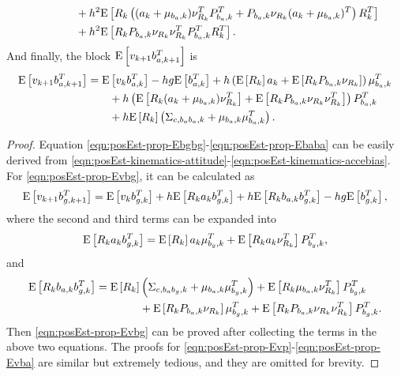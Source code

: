 \begin{theorem}
\begin{align}
		&\qquad\qquad + h^2\mathrm{E}\left[  R_k\left( (a_k+\mu_{b_a,k})\nu_{R_k}^TP_{b_a,k}^T + P_{b_a,k}\nu_{R_k}(a_k+\mu_{b_a,k})^T \right)R_k^T  \right] \nonumber \\
		&\qquad\qquad + h^2\mathrm{E}\left[ R_kP_{b_a,k}\nu_{R_k}\nu_{R_k}^TP_{b_a,k}^TR_k^T \right].
	\end{align}
	And finally, the block $\mathrm{E}\left[ v_{k+1}b_{a,k+1}^T \right]$ is
	\begin{align} \label{eqn:posEst-prop-Evba}
		\mathrm{E}\left[ v_{k+1}b_{a,k+1}^T \right] &= \mathrm{E}\left[ v_kb_{a,k}^T \right] - hg\mathrm{E}\left[ b_{a,k}^T \right] + h\left( \mathrm{E}\left[ R_k \right]a_k + \mathrm{E}\left[ R_kP_{b_a,k}\nu_{R_k} \right] \right) \mu_{b_a,k}^T \nonumber \\
		&\qquad + h\left( \mathrm{E}\left[ R_k(a_k+\mu_{b_a,k})\nu_{R_k}^T \right] + \mathrm{E}\left[ R_kP_{b_a,k}\nu_{R_k}\nu_{R_k}^T \right] \right) P_{b_a,k}^T \nonumber \\
		&\qquad + h\mathrm{E}\left[ R_k \right] \left( \Sigma_{c,b_ab_a,k} + \mu_{b_a,k}\mu_{b_a,k}^T \right).
	\end{align}
\end{theorem}
\begin{proof}
	Equation \eqref{eqn:posEst-prop-Ebgbg}-\eqref{eqn:posEst-prop-Ebaba} can be easily derived from \eqref{eqn:posEst-kinematics-attitude}-\eqref{eqn:posEst-kinematics-accebias}.
	For \eqref{eqn:posEst-prop-Evbg}, it can be calculated as
	\begin{align*}
		\mathrm{E}\left[ v_{k+1}b_{g,k+1}^T \right] = \mathrm{E}\left[ v_kb_{g,k}^T \right] + h\mathrm{E}\left[ R_ka_kb_{g,k}^T \right] + h\mathrm{E}\left[ R_kb_{a,k}b_{g,k}^T \right] - hg\mathrm{E}\left[ b_{g,k}^T \right],
	\end{align*}
	where the second and third terms can be expanded into
	\begin{align*}
		\mathrm{E}\left[ R_ka_kb_{g,k}^T \right] = \mathrm{E}\left[ R_k \right]a_k\mu_{b_g,k}^T + \mathrm{E}\left[ R_ka_k\nu_{R_k}^T \right]P_{b_g,k}^T,
	\end{align*}
	and
	\begin{align*}
		\mathrm{E}\left[ R_kb_{a,k}b_{g,k}^T \right] &= \mathrm{E}\left[ R_k \right] \left( \Sigma_{c,b_ab_g,k} + \mu_{b_a,k}\mu_{b_g,k}^T \right) + \mathrm{E}\left[ R_k\mu_{b_a,k}\nu_{R_k}^T \right]P_{b_g,k}^T \\
		&\qquad\qquad + \mathrm{E}\left[ R_kP_{b_a,k}\nu_{R_k} \right]\mu_{b_g,k}^T + \mathrm{E}\left[ R_kP_{b_a,k}\nu_{R_k}\nu_{R_k}^T \right]P_{b_g,k}^T.
	\end{align*}
	Then \eqref{eqn:posEst-prop-Evbg} can be proved after collecting the terms in the above two equations.
	The proofs for \eqref{eqn:posEst-prop-Evp}-\eqref{eqn:posEst-prop-Evba} are similar but extremely tedious, and they are omitted for brevity.
\end{proof}

